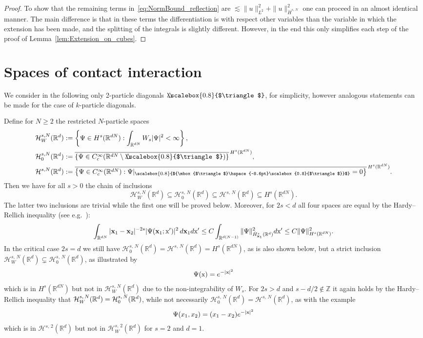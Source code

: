 \documentclass[10pt]{amsart}
\theoremstyle{definition}\newtheorem{defi}[theo]{Definition}\newtheorem{rema}[theo]{Remark}\newtheorem{exam}[theo]{Example}\newtheorem{exem}[theo]{Example}\newtheorem{nota}[theo]{Notation}
\newcommand*\R {\mathbb{R}}
\newcommand*\Z {\mathbb{Z}}
\newcommand\1{{\ensuremath {\mathds 1} }}
\newcommand{\bx}{\mathbf{x}}
\newcommand{\cH}{\mathcal{H}}
\newcommand{\sx}{\textup{x}}
\newcommand{\bDelta}{{\mbox{$\triangle$}\hspace{-8.6pt}\scalebox{0.8}{$\triangle$}}}
\newcommand{\scriptbDelta}{\scalebox{0.8}{$\bDelta$}}
\begin{document}
\begin{proof}
To show that the remaining terms in~\eqref{eq:NormBound_reflection} are $\lesssim \|u\|_{L^2}^2+\|u\|_{\dot{H}^{s,\,N}}^2$ one can proceed in an almost identical manner. The main difference is that in these terms the differentiation is with respect other variables than the variable in which the extension has been made, and the splitting of the integrals is slightly different. However, in the end this only simplifies each step of the proof of Lemma~\ref{lem:Extension_on_cubes}.
\end{proof}



\section{Spaces of contact interaction}\label{app:subspaces}

We consider in the following only 2-particle diagonals $\bDelta$, for simplicity, however analogous statements can be made for the case of $k$-particle diagonals.

Define for $N\ge 2$ the restricted $N$-particle spaces
\begin{align*}
\cH^{s,N}_W(\R^d) &:= \left\{ \Psi \in H^s(\R^{dN}): \int_{\R^{dN}} W_s |\Psi|^2 < \infty \right\}, \\
\cH^{s,N}_0(\R^d) &:= \overline{\left\{ \Psi \in C_c^\infty(\R^{dN} \setminus \bDelta) \right\} }^{\, H^s(\R^{dN})}, \\
\cH^{s,N}(\R^d) &:= \overline{\left\{ \Psi \in C_c^\infty(\R^{dN}): \Psi\rvert_{\scriptbDelta}=0 \right\} }^{\, H^s(\R^{dN})}.
\end{align*}
Then we have for all $s>0$ the chain of inclusions
\[
\cH^{s,N}_W(\R^d) \subseteq \cH^{s,\,N}_0(\R^d) \subseteq \cH^{s,\,N}(\R^d) \subseteq H^s(\R^{dN}).
\]
The latter two inclusions are trivial while the first one will be proved below. Moreover, for $2s < d$ all four spaces are equal by the Hardy--Rellich inequality (see e.g.~\cite{Yafaev-99}):
\[
\int_{\R^{dN}} |\bx_1-\bx_2|^{-2s}|\Psi(\bx_1;\sx')|^2 \,d\bx_1 d\sx'
\le C\int_{\R^{d(N-1)}} \|\Psi\|_{\dot{H}^s_{\bx_1}(\R^d)}^2 d\sx'
\le C\|\Psi\|_{H^s(\R^{dN})}^2.
\]
In the critical case $2s = d$ we still have $\cH_0^{s,\,N}(\R^d) = \cH^{s,\,N}(\R^d) = H^s(\R^{dN})$, as is also shown below, but a strict inclusion $\cH_W^{s,\,N}(\R^d) \subsetneq \cH_0^{s,\,N}(\R^d)$, as illustrated by
\[
\Psi(\sx) = e^{-|\sx|^2}
\]
which is in $H^s(\R^{dN})$ but not in $\cH_W^{s,\,N}(\R^d)$ due to the non-integrability of $W_s$. For $2s > d$ and $s-d/2 \notin \Z$ it again holds by the Hardy--Rellich inequality that $\cH_W^{s,\,N}(\R^d)\linebreak= \cH_0^{s,\,N}(\R^d)$, while not necessarily $\cH_0^{s,\,N}(\R^d) = \cH^{s,\,N}(\R^d)$, as with the example
\[
\Psi(x_1,x_2) = (x_1-x_2)e^{-|\sx|^2}
\]
which is in $\cH^{s,\,2}(\R^d)$ but not in $\cH_W^{s,\,2}(\R^d)$ for $s=2$ and $d=1$.
\end{document}
